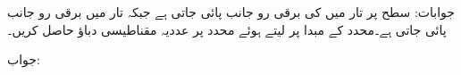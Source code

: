 جوابات: 
سطح  پر تار  میں  کی برقی رو  جانب پائی جاتی ہے جبکہ تار  میں  برقی رو  جانب پائی جاتی ہے۔محدد کے مبدا پر  لیتے ہوئے  محدد پر عددیہ مقناطیسی دباؤ  حاصل کریں۔

جواب:
